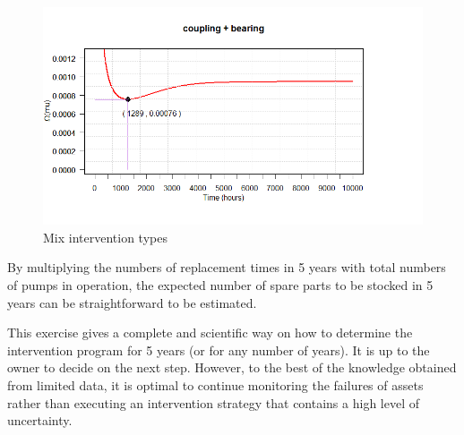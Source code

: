 \begin{figure}[h]
	\includegraphics[width =\textwidth]{figures/ch05_fig_mixIS}
	\caption{Mix intervention types}
	\label{ch05_fig_mixIS}
\end{figure}

By multiplying the numbers of replacement times in 5 years with total numbers of pumps in operation, the expected number of spare parts to be stocked in 5 years can be straightforward to be estimated.

This exercise gives a complete and scientific way on how to determine the intervention program for 5 years (or for any number of years). It is up to the owner to decide on the next step. However, to the best of the knowledge obtained from limited data, it is optimal to continue monitoring the failures of assets rather than executing an intervention strategy that contains a high level of uncertainty.
